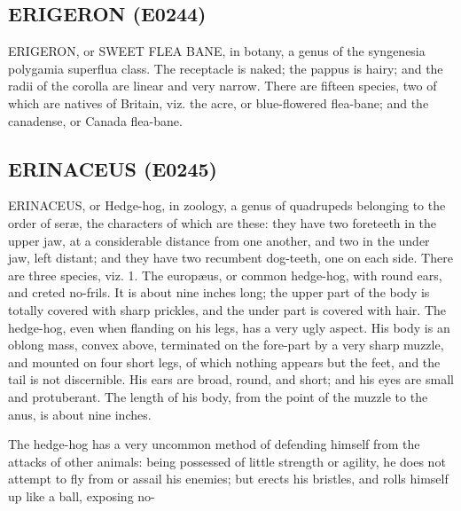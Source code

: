 \documentclass{article}
\begin{document}
\subsection*{ERIGERON (E0244)}
ERIGERON, or SWEET FLEA BANE, in botany, a genus of the syngenesia polygamia superflua class. The receptacle is naked; the pappus is hairy; and the radii of the corolla are linear and very narrow. There are fifteen species, two of which are natives of Britain, viz. the acre, or blue-flowered flea-bane; and the canadense, or Canada flea-bane.

\subsection*{ERINACEUS (E0245)}
ERINACEUS, or Hedge-hog, in zoology, a genus of quadrupeds belonging to the order of seræ, the characters of which are these: they have two foreteeth in the upper jaw, at a considerable distance from one another, and two in the under jaw, left distant; and they have two recumbent dog-teeth, one on each side. There are three species, viz. 1. The europæus, or common hedge-hog, with round ears, and creted no-frils. It is about nine inches long; the upper part of the body is totally covered with sharp prickles, and the under part is covered with hair. The hedge-hog, even when flanding on his legs, has a very ugly aspect. His body is an oblong mass, convex above, terminated on the fore-part by a very sharp muzzle, and mounted on four short legs, of which nothing appears but the feet, and the tail is not discernible. His ears are broad, round, and short; and his eyes are small and protuberant. The length of his body, from the point of the muzzle to the anus, is about nine inches.

The hedge-hog has a very uncommon method of defending himself from the attacks of other animals: being possessed of little strength or agility, he does not attempt to fly from or assail his enemies; but erects his bristles, and rolls himself up like a ball, exposing no-
\end{document}

